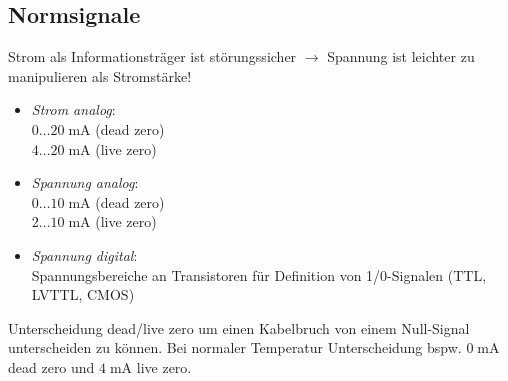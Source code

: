 \subsection{Normsignale}
Strom als Informationsträger ist störungssicher $\to$ Spannung ist leichter zu manipulieren als Stromstärke!
\begin{itemize}
\item \emph{Strom analog}:\\
$0\dots 20\; \mathrm{mA}$ (dead zero)\\
$4 \dots 20 \;\mathrm{mA}$ (live zero)
\item \emph{Spannung analog}:\\
$0\dots 10 \;\mathrm{mA}$ (dead zero)\\
$2 \dots 10 \;\mathrm{mA}$ (live zero)
\item \emph{Spannung digital}:\\
Spannungsbereiche an Transistoren für Definition von 1/0-Signalen (TTL, LVTTL, CMOS)
\end{itemize}
Unterscheidung dead/live zero um einen Kabelbruch von einem Null-Signal unterscheiden zu können. Bei normaler Temperatur Unterscheidung bspw. $0\;\mathrm{mA}$ dead zero und $4 \;\mathrm{mA}$ live zero.


